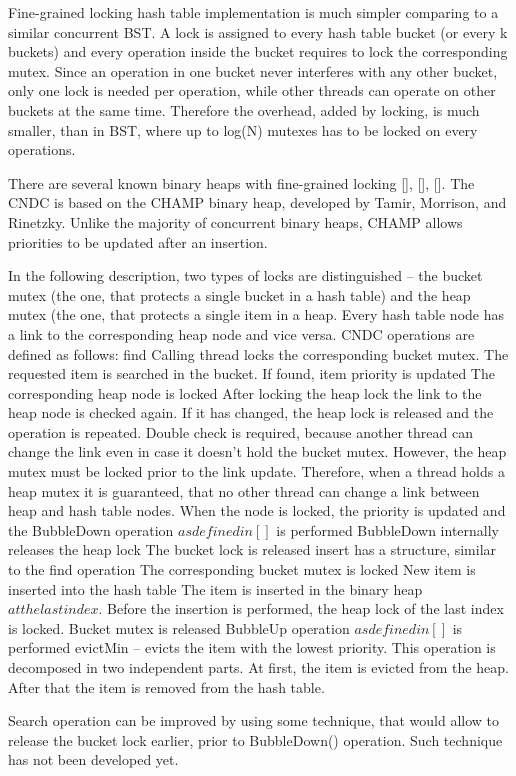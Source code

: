 Fine-grained locking hash table implementation is much simpler comparing to a similar concurrent BST. A lock is assigned to every hash table bucket (or every k buckets) and every operation inside the bucket requires to lock the corresponding mutex. Since an operation in one bucket never interferes with any other bucket, only one lock is needed per operation, while other threads can operate on other buckets at the same time. Therefore the overhead, added by locking, is much smaller, than in BST, where up to log(N) mutexes has to be locked on every operations.

There are several known binary heaps with fine-grained locking [], [], []. The CNDC is based on the CHAMP binary heap, developed by Tamir, Morrison, and Rinetzky. Unlike the majority of concurrent binary heaps, CHAMP allows priorities to be updated after an insertion.

In the following description, two types of locks are distinguished – the bucket mutex (the one, that protects a single bucket in a hash table) and the heap mutex (the one, that protects a single item in a heap. Every hash table node has a link to the corresponding heap node and vice versa. CNDC operations are defined as follows:
find
Calling thread locks the corresponding bucket mutex.
The requested item is searched in the bucket.
If found, item priority is updated
The corresponding heap node is locked
After locking the heap lock the link to the heap node is checked again. If it has changed, the heap lock is released and the operation is repeated. Double check is required, because another thread can change the link even in case it doesn’t hold the bucket mutex. However, the heap mutex must be locked prior to the link update. Therefore, when a thread holds a heap mutex it is guaranteed, that no other thread can change a link between heap and hash table nodes.
When the node is locked, the priority is updated and the BubbleDown operation \(as defined in []\) is performed
BubbleDown internally releases the heap lock
The bucket lock is released
insert has a structure, similar to the find operation
The corresponding bucket mutex is locked
New item is inserted into the hash table
The item is inserted in the binary heap \(at the last index\). Before the insertion is performed, the heap lock of the last index is locked.
Bucket mutex is released
BubbleUp operation \(as defined in []\) is performed
evictMin\(\) – evicts the item with the lowest priority. This operation is decomposed in two independent parts.
At first, the item is evicted from the heap.
After that the item is removed from the hash table.

Search operation can be improved by using some technique, that would allow to release the bucket lock earlier, prior to BubbleDown() operation. Such technique has not been developed yet.

